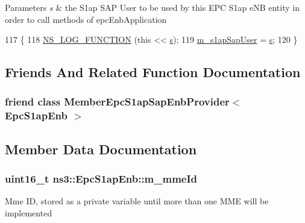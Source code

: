 \begin{DoxyParams}{Parameters}
{\em s} & the S1ap S\+AP User to be used by this E\+PC S1ap e\+NB entity in order to call methods of epc\+Enb\+Application \\
\hline
\end{DoxyParams}

\begin{DoxyCode}
117 \{
118   \hyperlink{log-macros-disabled_8h_a90b90d5bad1f39cb1b64923ea94c0761}{NS\_LOG\_FUNCTION} (\textcolor{keyword}{this} << \hyperlink{generate__test__data__lte__sinr_8m_ad83eeb3a142285d1243a08c6b7026df8}{s});
119   \hyperlink{classns3_1_1EpcS1apEnb_a6905f0d78d5d39dd5f6d521ec9615713}{m\_s1apSapUser} = \hyperlink{generate__test__data__lte__sinr_8m_ad83eeb3a142285d1243a08c6b7026df8}{s};
120 \}
\end{DoxyCode}


\subsection{Friends And Related Function Documentation}
\subsubsection[{\texorpdfstring{Member\+Epc\+S1ap\+Sap\+Enb\+Provider$<$ Epc\+S1ap\+Enb $>$}{MemberEpcS1apSapEnbProvider< EpcS1apEnb >}}]{\setlength{\rightskip}{0pt plus 5cm}friend class {\bf Member\+Epc\+S1ap\+Sap\+Enb\+Provider}$<$ {\bf Epc\+S1ap\+Enb} $>$\hspace{0.3cm}{\ttfamily [friend]}}\hypertarget{classns3_1_1EpcS1apEnb_aa982c937328ff55cbf78441c54e09db1}{}\label{classns3_1_1EpcS1apEnb_aa982c937328ff55cbf78441c54e09db1}


\subsection{Member Data Documentation}
\subsubsection[{\texorpdfstring{m\+\_\+mme\+Id}{m_mmeId}}]{\setlength{\rightskip}{0pt plus 5cm}uint16\+\_\+t ns3\+::\+Epc\+S1ap\+Enb\+::m\+\_\+mme\+Id\hspace{0.3cm}{\ttfamily [private]}}\hypertarget{classns3_1_1EpcS1apEnb_a44a703502c1439b86664b12751b15d69}{}\label{classns3_1_1EpcS1apEnb_a44a703502c1439b86664b12751b15d69}
Mme ID, stored as a private variable until more than one M\+ME will be implemented 

